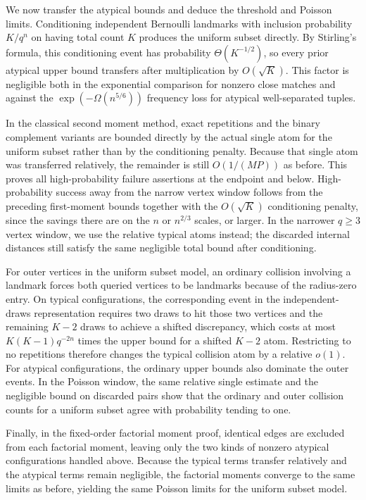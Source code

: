 We now transfer the atypical bounds and deduce the threshold and Poisson limits. Conditioning independent Bernoulli landmarks with inclusion probability \(K/q^n\) on having total count \(K\) produces the uniform subset directly. By Stirling's formula, this conditioning event has probability \(\Theta(K^{-1/2})\), so every prior atypical upper bound transfers after multiplication by \(O(\sqrt K)\). This factor is negligible both in the exponential comparison for nonzero close matches and against the \(\exp(-\Omega(n^{5/6}))\) frequency loss for atypical well-separated tuples.

In the classical second moment method, exact repetitions and the binary complement variants are bounded directly by the actual single atom for the uniform subset rather than by the conditioning penalty. Because that single atom was transferred relatively, the remainder is still \(O(1/(MP))\) as before. This proves all high-probability failure assertions at the endpoint and below. High-probability success away from the narrow vertex window follows from the preceding first-moment bounds together with the \(O(\sqrt K)\) conditioning penalty, since the savings there are on the \(n\) or \(n^{2/3}\) scales, or larger. In the narrower \(q\ge3\) vertex window, we use the relative typical atoms instead; the discarded internal distances still satisfy the same negligible total bound after conditioning.

For outer vertices in the uniform subset model, an ordinary collision involving a landmark forces both queried vertices to be landmarks because of the radius-zero entry. On typical configurations, the corresponding event in the independent-draws representation requires two draws to hit those two vertices and the remaining \(K-2\) draws to achieve a shifted discrepancy, which costs at most \(K(K-1)q^{-2n}\) times the upper bound for a shifted \(K-2\) atom. Restricting to no repetitions therefore changes the typical collision atom by a relative \(o(1)\). For atypical configurations, the ordinary upper bounds also dominate the outer events. In the Poisson window, the same relative single estimate and the negligible bound on discarded pairs show that the ordinary and outer collision counts for a uniform subset agree with probability tending to one.

Finally, in the fixed-order factorial moment proof, identical edges are excluded from each factorial moment, leaving only the two kinds of nonzero atypical configurations handled above. Because the typical terms transfer relatively and the atypical terms remain negligible, the factorial moments converge to the same limits as before, yielding the same Poisson limits for the uniform subset model.
